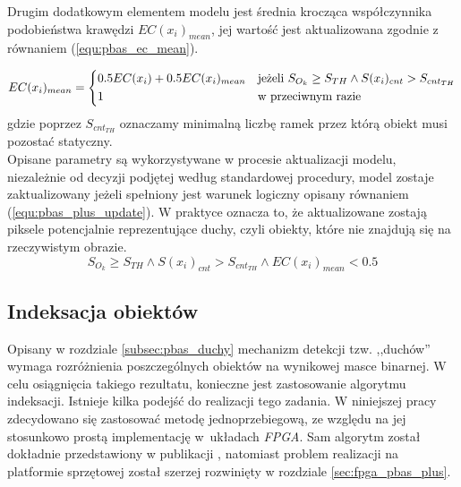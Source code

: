 Drugim dodatkowym elementem modelu jest średnia krocząca współczynnika podobieństwa krawędzi $EC(x_i)_{mean}$, jej wartość jest aktualizowana zgodnie z równaniem (\ref{equ:pbas_ec_mean}).

    \begin{equation}
	    EC(x_i)_{mean} = 
		\begin{dcases}
    		0.5EC(x_i) + 0.5EC(x_i)_{mean} & \text{jeżeli } S_{O_k} \geq  S_{TH} \land S(x_i)_{cnt} > S_{{cnt}_{TH}}	 \\
            1                & \text{w przeciwnym razie}		
		\end{dcases}
	\label{equ:pbas_ec_mean}	
	\end{equation}
\noindent gdzie poprzez $S_{{cnt}_{TH}}$ oznaczamy minimalną liczbę ramek przez którą obiekt musi pozostać statyczny.
\\
\noindent Opisane parametry są wykorzystywane w procesie aktualizacji modelu, niezależnie od decyzji podjętej według standardowej procedury, model zostaje zaktualizowany jeżeli spełniony jest warunek logiczny opisany równaniem (\ref{equ:pbas_plus_update}). W praktyce oznacza to, że aktualizowane zostają piksele potencjalnie reprezentujące duchy, czyli obiekty, które nie znajdują się na rzeczywistym obrazie.
    \begin{equation}
	    S_{O_k} \geq S_{TH} \land S(x_i)_{cnt} > S_{cnt_{TH}} \land EC(x_i)_{mean} < 0.5
	\label{equ:pbas_plus_update}	
	\end{equation}
	


\subsection{Indeksacja obiektów}
\label{subsec:pbas_indeksacja}

Opisany w rozdziale \ref{subsec:pbas_duchy} mechanizm detekcji tzw. ,,duchów'' wymaga rozróżnienia poszczególnych obiektów na wynikowej masce binarnej. 
W celu osiągnięcia takiego rezultatu, konieczne jest zastosowanie algorytmu indeksacji. 
Istnieje kilka podejść do realizacji tego zadania. 
W niniejszej pracy zdecydowano się zastosować metodę jednoprzebiegową, ze względu na jej stosunkowo prostą implementację w~układach \textit{FPGA}. Sam algorytm został dokładnie przedstawiony w publikacji \cite{kryjak_14_pbas}, natomiast problem realizacji na platformie sprzętowej został szerzej rozwinięty w rozdziale \ref{sec:fpga_pbas_plus}. 

